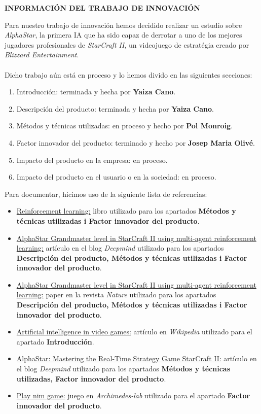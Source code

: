 \documentclass[a4paper,10pt]{report}
\begin{document}
	
\newpage
\begin{flushleft}
\textbf{INFORMACIÓN DEL TRABAJO DE INNOVACIÓN} \\
\end{flushleft}
    Para nuestro trabajo de innovación hemos decidido realizar un estudio sobre \textit{AlphaStar}, la primera IA que ha sido capaz de derrotar a uno de los mejores jugadores profesionales de \textit{StarCraft II}, un videojuego de estratégia creado por \textit{Blizzard Entertainment}.\\\\
    Dicho trabajo aún está en proceso y lo hemos divido en las siguientes secciones:
    \begin{enumerate}
        \item Introducción: terminada y hecha por \textbf{Yaiza Cano}.
        \item Descripción del producto: terminada y hecha por \textbf{Yaiza Cano}.
        \item Métodos y técnicas utilizadas: en proceso y hecho por \textbf{Pol Monroig}.
        \item Factor innovador del producto: terminado y hecho por \textbf{Josep Maria Olivé}.
        		  \item Impacto del producto en la empresa: en proceso.
        		  \item Impacto del producto en el usuario o en la sociedad: en proceso.\\
    \end{enumerate}
    Para documentar, hicimos uso de la siguiente lista de referencias:
    \begin{itemize}
        \item \uline{Reinforcement learning:} libro utilizado para los apartados \textbf{Métodos y técnicas utilizadas i Factor innovador del producto}.
        \item \uline{AlphaStar Grandmaster level in StarCraft II using multi-agent reinforcement learning:} artículo en el blog \textit{Deepmind} utilizado para los apartados \textbf{Descripción del producto, Métodos y técnicas utilizadas i Factor innovador del producto}.
        \item \uline{AlphaStar Grandmaster level in StarCraft II using multi-agent reinforcement learning:} paper en la revista \textit{Nature} utilizado para los apartados \textbf{Descripción del producto, Métodos y técnicas utilizadas i Factor innovador del producto}.
        \item \uline{Artificial intelligence in video games:} artículo en \textit{Wikipedia} utilizado para el apartado \textbf{Introducción}.
        \item \uline{AlphaStar: Mastering the Real-Time Strategy Game StarCraft II:} artículo en el blog \textit{Deepmind} utilizado para los apartados \textbf{Métodos y técnicas utilizadas, Factor innovador del producto}.
        \item \uline{Play nim game:} juego en \textit{Archimedes-lab} utilizado para el apartado \textbf{Factor innovador del producto}.
        
    \end{itemize}
\end{document}
